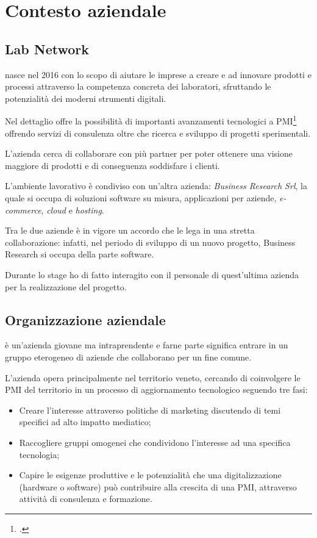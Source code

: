 
\chapter{Contesto aziendale}
\label{cap:introduzione}

\section{Lab Network}
\lab{} nasce nel 2016 con lo scopo di aiutare le imprese a creare e ad innovare prodotti e processi attraverso la competenza concreta dei laboratori, sfruttando le potenzialità dei moderni strumenti digitali.

Nel dettaglio \lab{} offre la possibilità di importanti avanzamenti tecnologici a PMI\footcite{Piccole e Medie Imprese} offrendo servizi di consulenza oltre che ricerca e sviluppo di progetti sperimentali.

L'azienda cerca di collaborare con più partner per poter ottenere una visione maggiore di prodotti e di conseguenza soddisfare i clienti.

L'ambiente lavorativo è condiviso con un'altra azienda: \textit{Business Research Srl}, la quale si occupa di soluzioni software su misura, applicazioni per aziende, \textit{e-commerce}, \textit{cloud} e \textit{hosting}.

Tra le due aziende è in vigore un accordo che le lega in una stretta collaborazione: infatti, nel periodo di sviluppo di un nuovo progetto, Business Research si occupa della parte software.

Durante lo stage ho di fatto interagito con il personale di quest'ultima azienda per la realizzazione del progetto.

\section{Organizzazione aziendale}
\lab{} è un'azienda giovane ma intraprendente e farne parte significa entrare in un gruppo eterogeneo di aziende che collaborano per un fine comune.

\noindent L'azienda opera principalmente nel territorio veneto, cercando di coinvolgere le PMI del territorio in un processo di aggiornamento tecnologico seguendo tre fasi:
\begin{itemize}
\item Creare l'interesse attraverso politiche di marketing discutendo di temi specifici ad alto impatto mediatico;
\item Raccogliere gruppi omogenei che condividono l'interesse ad una specifica tecnologia;
\item Capire le esigenze produttive e le potenzialità che una digitalizzazione (hardware o software) può contribuire alla crescita di una PMI, attraverso attività di consulenza e formazione.
\end{itemize}

